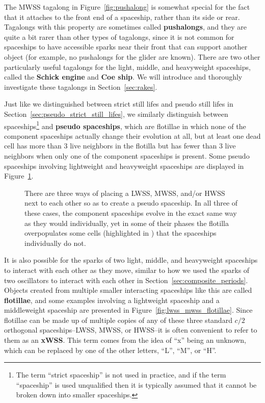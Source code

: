 The MWSS tagalong in Figure~\ref{fig:pushalong} is somewhat special for the fact that it attaches to the front end of a spaceship, rather than its side or rear. Tagalongs with this property are sometimes called \textbf{pushalongs}, and they are quite a bit rarer than other types of tagalongs, since it is not common for spaceships to have accessible sparks near their front that can support another object (for example, no pushalongs for the glider are known). There are two other particularly useful tagalongs for the light, middle, and heavyweight spaceships, called the \textbf{Schick engine} and \textbf{Coe ship}. We will introduce and thoroughly investigate these tagalongs in Section~\ref{sec:rakes}.

Just like we distinguished between strict still lifes and pseudo still lifes in Section~\ref{sec:pseudo_strict_still_lifes}, we similarly distinguish between spaceships\footnote{The term ``strict spaceship'' is not used in practice, and if the term ``spaceship'' is used unqualified then it is typically assumed that it cannot be broken down into smaller spaceships.} and \textbf{pseudo spaceships}, which are flotillae in which none of the component spaceships actually change their evolution at all, but at least one dead cell has more than $3$ live neighbors in the flotilla but has fewer than $3$ live neighbors when only one of the component spaceships is present. Some pseudo spaceships involving lightweight and heavyweight spaceships are displayed in Figure~\ref{fig:lwss_hwss_pseudo}.

\begin{figure}[!htb]
	\centering
	\caption{There are three ways of placing a LWSS, MWSS, and/or HWSS next to each other so as to create a pseudo spaceship. In all three of these cases, the component spaceships evolve in the exact same way as they would individually, yet in some of their phases the flotilla overpopulates some cells (highlighted in ) that the spaceships individually do not.}\label{fig:lwss_hwss_pseudo}
\end{figure}

It is also possible for the sparks of two light, middle, and heavyweight spaceships to interact with each other as they move, similar to how we used the sparks of two oscillators to interact with each other in Section~\ref{sec:composite_periods}. Objects created from multiple smaller interacting spaceships like this are called \textbf{flotillae}, and some examples involving a lightweight spaceship and a middleweight spaceship are presented in Figure~\ref{fig:lwss_mwss_flotillae}. Since flotillae can be made up of multiple copies of any of these three standard $c/2$ orthogonal spaceships--LWSS, MWSS, or HWSS--it is often convenient to refer to them as an \textbf{xWSS}. This term comes from the idea of ``x'' being an unknown, which can be replaced by one of the other letters, ``L'', ``M'', or ``H''.

